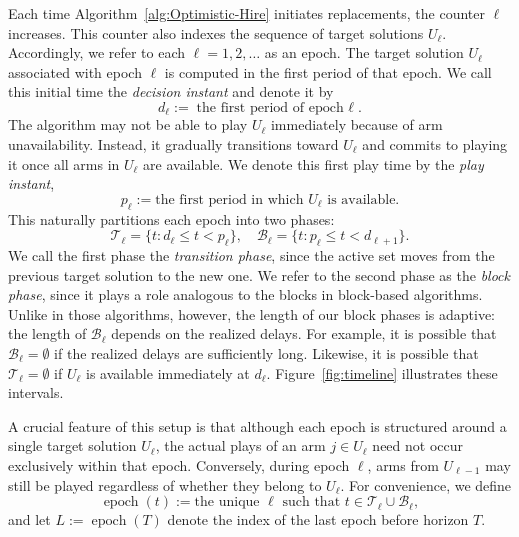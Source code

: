 \documentclass[opre,blindrev]{informs3}
\newcommand{\epoch}{\operatorname{epoch}}
\begin{document}
\begin{APPENDICES}
Each time Algorithm~\ref{alg:Optimistic-Hire} initiates replacements, the counter \(\ell\) increases. This counter also indexes the sequence of target solutions \(U_{\ell}\). Accordingly, we refer to each \(\ell = 1,2,\dots\) as an epoch. The target solution \(U_\ell\) associated with epoch \(\ell\) is computed in the first period of that epoch. We call this initial time the \emph{decision instant} and denote it by
\begin{equation}\label{eq:c-def}
    d_\ell := \text{the first period of epoch \(\ell\)}.
\end{equation}
The algorithm may not be able to play \(U_\ell\) immediately because of arm unavailability. Instead, it gradually transitions toward \(U_\ell\) and commits to playing it once all arms in \(U_\ell\) are available. We denote this first play time by the \emph{play instant},
\begin{equation}\label{p-def}
    p_\ell := \text{the first period in which \(U_\ell\) is available}.
\end{equation}
This naturally partitions each epoch into two phases:
\[
    \mathcal{T}_\ell = \{ t : d_\ell \le t < p_\ell \},
    \quad
    \mathcal{B}_\ell = \{ t : p_\ell \le t < d_{\ell+1} \}.
\]
We call the first phase the \emph{transition phase}, since the active set moves from the previous target solution to the new one. We refer to the second phase as the \emph{block phase}, since it plays a role analogous to the blocks in block-based algorithms. Unlike in those algorithms, however, the length of our block phases is adaptive: the length of \(\mathcal{B}_{\ell}\) depends on the realized delays. For example, it is possible that \(\mathcal{B}_\ell = \emptyset\) if the realized delays are sufficiently long. Likewise, it is possible that \(\mathcal{T}_\ell = \emptyset\) if \(U_\ell\) is available immediately at \(d_\ell\). Figure~\ref{fig:timeline} illustrates these intervals.

A crucial feature of this setup is that although each epoch is structured around a single target solution \(U_{\ell}\), the actual plays of an arm \(j \in U_\ell\) need not occur exclusively within that epoch. Conversely, during epoch \(\ell\), arms from \(U_{\ell-1}\) may still be played regardless of whether they belong to \(U_\ell\). For convenience, we define
\[
    \epoch(t) := \text{the unique \(\ell\) such that \(t \in \mathcal{T}_\ell \cup \mathcal{B}_\ell\)},
\]
and let \(L := \epoch(T)\) denote the index of the last epoch before horizon \(T\).

\begin{figure}[t] 
    \centering
    \begin{tikzpicture}[xscale=1, yscale=1]
    

\end{tikzpicture}
\end{figure}
\end{APPENDICES}
\end{document}
